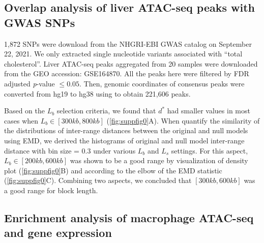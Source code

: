 \documentclass{article}
\begin{document}

\subsection{Overlap analysis of liver ATAC-seq peaks with GWAS SNPs} \label{sec:liveratac}

1,872 SNPs were download from the NHGRI-EBI GWAS catalog
\citep{gwascatalog} on September 22, 2021. We only extracted single
nucleotide variants associated with ``total cholesterol''. Liver ATAC-seq peaks
\citep{CURRIN20211169} aggregated from 20 samples were downloaded from
the GEO accession: GSE164870. All the peaks here were filtered by FDR adjusted \textit{p}-value $\leq 0.05$.
Then, genomic coordinates of consensus peaks were converted from hg19 to
hg38 using  to obtain 221,606 peaks.

Based on the $L_b$ selection criteria, we found that $d^*$ had
smaller values in most cases when $L_b \in [300kb,800kb]$
(\cref{fig:suppfig0}A). When quantify the similarity of the distributions of
inter-range distances between the original and 
null models using EMD, we derived the histograms of
original and
null model inter-range distance with bin size = 0.3 under various
$L_b$ and $L_s$ settings.
For this aspect, $L_b \in [200kb,600kb]$ was
shown to be a good range by visualization of density plot
(\cref{fig:suppfig0}B) and according to the elbow of the EMD statistic
(\cref{fig:suppfig0}C). Combining two aspects, we concluded that $[300kb,600kb]$ was a good range for block length.

\subsection{Enrichment analysis of macrophage ATAC-seq and gene expression}\label{sec:splines}
\end{document}
